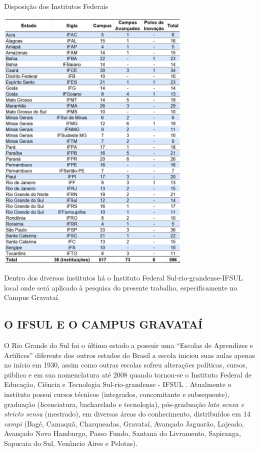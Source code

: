 \graphicspath{{tabelas/}}
\begin{table}[!ht]
\centering
\begin{minipage}{1.\textwidth}
\caption{Disposição dos Institutos Federais}
\centering
\includegraphics[width=0.7\textwidth]{tabela02-institutos.png}
\label{tab: tabela02-institutos}
\end{minipage}
\end{table}

Dentro dos diversos institutos há o Instituto Federal Sul-rio-grandense-IFSUL local onde será aplicado à pesquisa do presente trabalho, especificamente no Campus Gravataí.

\subsection{O IFSUL E O CAMPUS GRAVATAÍ}
O Rio Grande do Sul foi o último estado a possuir uma “Escolas de Aprendizes e Artífices” diferente dos outros estados do Brasil a escola iniciou suas aulas apenas no início em 1930, assim como outras escolas sofreu alterações políticas, cursos, público e em sua nomenclatura até 2008 quando tornou-se o Instituto Federal de Educação, Ciência e Tecnologia Sul-rio-grandense - IFSUL \cite{ifsul2015}. Atualmente o instituto possui cursos técnicos (integrados, concomitante e subsequente), graduação (licenciatura, bacharelado e tecnologia), pós-graduação \textit{lato sensu e stricto sensu} (mestrado), em diversas áreas do conhecimento, distribuídos em 14 \textit{campi} (Bagé, Camaquã, Charqueadas, Gravataí, Avançado Jaguarão, Lajeado, Avançado Novo Hamburgo, Passo Fundo, Santana do Livramento, Sapiranga, Sapucaia do Sul, Venâncio Aires e Pelotas).

